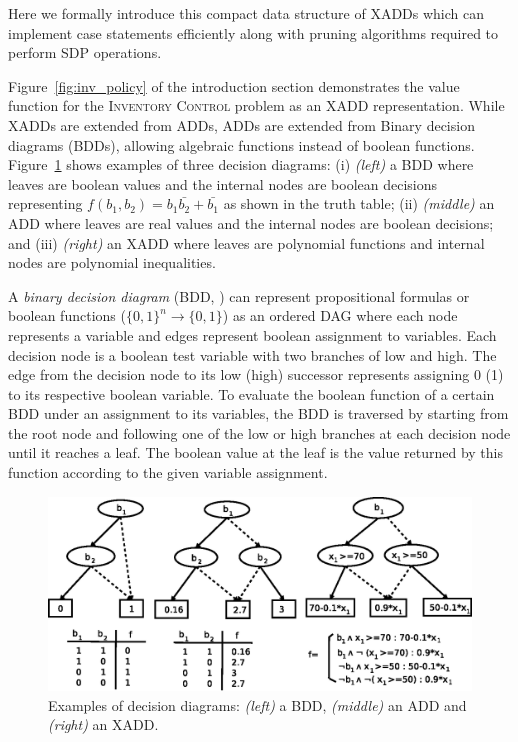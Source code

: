 \documentclass[twoside,11pt]{article}
\newcommand{\InventoryControl}{\textsc{Inventory Control }}
\begin{document}
Here we formally introduce this compact data structure of XADDs which can implement case statements efficiently along with pruning algorithms required to perform SDP operations.
 
 Figure~\ref{fig:inv_policy} of the introduction section demonstrates the value function for the \InventoryControl problem as an XADD representation. While XADDs are extended from ADDs, ADDs are extended from Binary decision diagrams (BDDs), allowing algebraic functions instead of boolean functions. 
 Figure~\ref{fig:bdd_add_xadd} shows examples of three decision diagrams: (i) {\it (left)} a BDD where leaves are boolean values and the internal nodes are boolean decisions representing $f(b_1,b_2) = b_1\bar{b_2}+\bar{b_1}$ as shown in the truth table; (ii) {\it (middle)} an ADD where leaves are real values  and the internal nodes are boolean decisions; and (iii) {\it (right)} an XADD where leaves are polynomial functions and internal nodes are polynomial inequalities.   

A \emph{binary decision diagram} (BDD, \cite{bryant}) can represent propositional formulas or boolean functions ($\lbrace 0,1\rbrace^n \rightarrow \lbrace 0,1\rbrace$) as an ordered DAG where each node represents a variable and edges represent boolean assignment to  variables. Each decision node is a boolean test variable with two branches of low and high. The edge from the decision node to its low (high) successor represents assigning 0 (1) to its respective boolean variable. To evaluate the boolean function of a certain BDD under an assignment to its variables, the BDD is traversed by starting from the root node and following one of the low or high branches at each decision node until it reaches a leaf. The boolean value at the leaf is the value returned by this function according to the given variable assignment. 
\begin{figure}[t!]
\centering
\includegraphics[width=1.0\textwidth]{FiguresSource/bddaddxadd.eps}
\vspace{-1mm}

\caption{%
Examples of decision diagrams: {\it (left)} a BDD, {\it (middle)} an ADD and {\it (right)} an XADD.}
\label{fig:bdd_add_xadd}
\end{figure}
\end{document}
